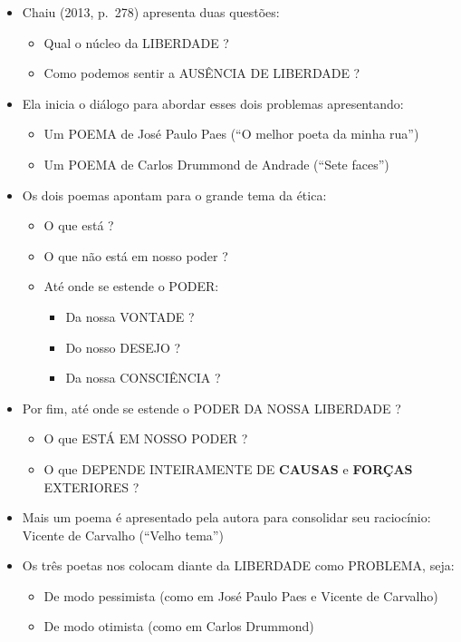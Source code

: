 \documentclass[
]{book}
\providecommand{\tightlist}{%
  \setlength{\itemsep}{0pt}\setlength{\parskip}{0pt}}
\begin{document}
\begin{itemize}
\tightlist
\item
  Chaiu (2013, p.~278) apresenta duas questões:

  \begin{itemize}
  \tightlist
  \item
    Qual o núcleo da LIBERDADE ?
  \item
    Como podemos sentir a AUSÊNCIA DE LIBERDADE ?
  \end{itemize}
\item
  Ela inicia o diálogo para abordar esses dois problemas apresentando:

  \begin{itemize}
  \tightlist
  \item
    Um POEMA de José Paulo Paes (``O melhor poeta da minha rua'')
  \item
    Um POEMA de Carlos Drummond de Andrade (``Sete faces'')
  \end{itemize}
\item
  Os dois poemas apontam para o grande tema da ética:

  \begin{itemize}
  \tightlist
  \item
    O que está ?
  \item
    O que não está em nosso poder ?
  \item
    Até onde se estende o PODER:

    \begin{itemize}
    \tightlist
    \item
      Da nossa VONTADE ?
    \item
      Do nosso DESEJO ?
    \item
      Da nossa CONSCIÊNCIA ?
    \end{itemize}
  \end{itemize}
\item
  Por fim, até onde se estende o PODER DA NOSSA LIBERDADE ?

  \begin{itemize}
  \tightlist
  \item
    O que ESTÁ EM NOSSO PODER ?
  \item
    O que DEPENDE INTEIRAMENTE DE \textbf{CAUSAS} e \textbf{FORÇAS}
    EXTERIORES ?
  \end{itemize}
\item
  Mais um poema é apresentado pela autora para consolidar seu
  raciocínio: Vicente de Carvalho (``Velho tema'')
\item
  Os três poetas nos colocam diante da LIBERDADE como PROBLEMA, seja:

  \begin{itemize}
  \tightlist
  \item
    De modo pessimista (como em José Paulo Paes e Vicente de Carvalho)
  \item
    De modo otimista (como em Carlos Drummond)
  \end{itemize}
\end{itemize}
\end{document}
